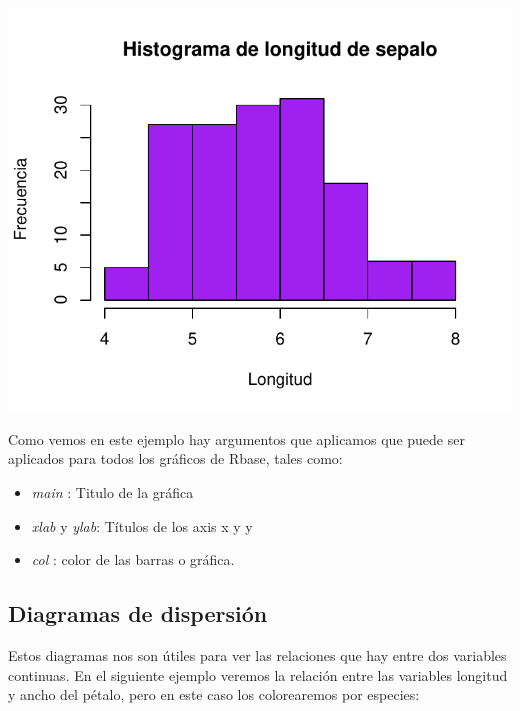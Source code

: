 \documentclass[
]{book}
\newenvironment{Shaded}{\begin{snugshade}}{\end{snugshade}}
\newcommand{\AttributeTok}[1]{\textcolor[rgb]{0.13,0.29,0.53}{#1}}
\newcommand{\FunctionTok}[1]{\textcolor[rgb]{0.13,0.29,0.53}{\textbf{#1}}}
\newcommand{\NormalTok}[1]{#1}
\newcommand{\SpecialCharTok}[1]{\textcolor[rgb]{0.81,0.36,0.00}{\textbf{#1}}}
\newcommand{\StringTok}[1]{\textcolor[rgb]{0.31,0.60,0.02}{#1}}
\begin{document}
\begin{center}\includegraphics{_main_files/figure-latex/unnamed-chunk-191-1} \end{center}

Como vemos en este ejemplo hay argumentos que aplicamos que puede ser aplicados para todos los gráficos de Rbase, tales como:

\begin{itemize}
\item
  \emph{main} : Titulo de la gráfica
\item
  \emph{xlab} y \emph{ylab}: Títulos de los axis x y y
\item
  \emph{col} : color de las barras o gráfica.
\end{itemize}

\subsection{Diagramas de dispersión}\label{diagramas-de-dispersiuxf3n}

Estos diagramas nos son útiles para ver las relaciones que hay entre dos variables continuas.
En el siguiente ejemplo veremos la relación entre las variables longitud y ancho del pétalo, pero en este caso los colorearemos por especies:

\begin{Shaded}
\end{Shaded}
\end{document}
